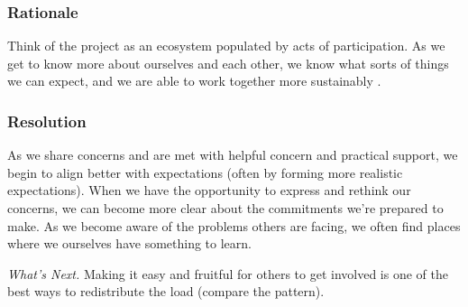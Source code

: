 \subsubsection*{Rationale}

Think of the project as an ecosystem populated by acts of participation.  As we get to know more about ourselves and each other, we know what sorts of things we can expect, and we are able to work together more sustainably \cite{ostrom2010revising}.

\subsubsection*{Resolution}

As we share concerns and are met with helpful concern and practical support, we begin to align better with expectations (often by forming more realistic expectations).  When we have the opportunity to express and rethink our concerns, we can become more clear about the commitments we're prepared to make.  As we become aware of the problems others are facing, we often find places where we ourselves have something to learn.

\begin{framed}
\emph{What's Next.}  Making it easy and fruitful for others to get involved is one of the best ways to redistribute the load (compare the
 pattern).
\end{framed}

